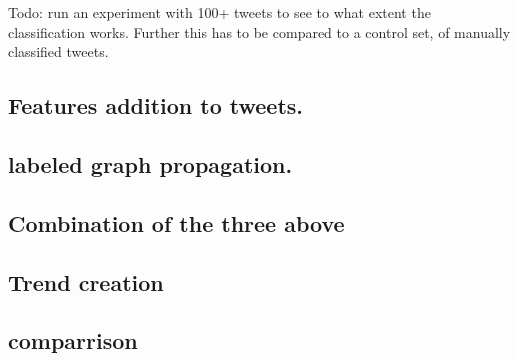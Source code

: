 Todo: run an experiment with 100+ tweets to see to what extent the
classification works. Further this has to be compared to a control set, of
manually classified tweets.  

\subsection{Features addition to tweets.}
\subsection{labeled graph propagation.}
\subsection{Combination of the three above}
\subsection{Trend creation}
\subsection{comparrison}
